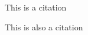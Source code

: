 This is a citation \cite{dummykey}

This is also a citation \parencite[e.g.][page 213]{dummykey}

\lipsum[1-10]